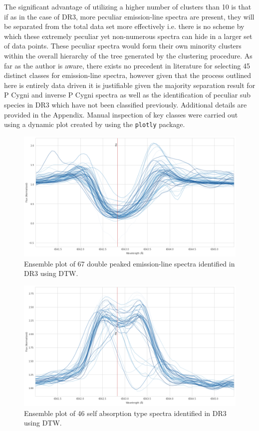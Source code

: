 The significant advantage of utilizing a higher number of clusters than 10 is that if as in the case of DR3, more peculiar emission-line spectra are present, they will be separated from the total data set more effectively i.e. there is no scheme by which these extremely peculiar yet non-numerous spectra can hide in a larger set of data points. These peculiar spectra would form their own minority clusters within the overall hierarchy of the tree generated by the clustering procedure. As far as the author is aware, there exists no precedent in literature for selecting 45 distinct classes for emission-line spectra, however given that the process outlined here is entirely data driven it is justifiable given the majority separation result for P Cygni and inverse P Cygni spectra as well as the identification of peculiar sub species in DR3 which have not been classified previously. Additional details are provided in the Appendix. Manual inspection of key classes were carried out using a dynamic plot created by using the \texttt{plotly} package.

\begin{figure}[!htb]
\centering
\includegraphics[scale=0.45]{figures/double peak 1.png}
\caption{Ensemble plot of 67 double peaked emission-line spectra identified in DR3 using DTW.}
\end{figure}

\begin{figure}[!htb]
\centering
\includegraphics[scale=0.45]{figures/emission on abs.png}
\caption{Ensemble plot of 46 self absorption type spectra identified in DR3 using DTW.}
\end{figure}









